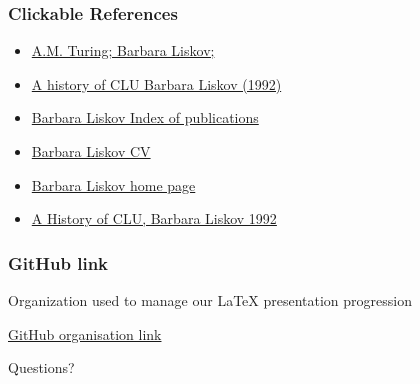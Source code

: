 \documentclass{beamer}
\begin{document}


\begin{frame}
\frametitle{Clickable References}
\begin{itemize}
\item \href{https://amturing.acm.org/award_winners/liskov_1108679.cfm}{ A.M. Turing; Barbara Liskov;} 

\item \href {https://dl.acm.org/doi/abs/10.1145/155360.155367}{A history of CLU Barbara Liskov (1992)}

\item \href{https://dblp.uni-trier.de/pid/l/BarbaraLiskov.html}{Barbara Liskov Index of publications}

\item \href{http://www.pmg.csail.mit.edu/~liskov/newcv-09.pdf}{Barbara Liskov CV}

\item \href{http://www.pmg.csail.mit.edu/~liskov/}{Barbara Liskov home page}

\item \href{https://citeseerx.ist.psu.edu/viewdoc/download?doi=10.1.1.46.9499&rep=rep1&type=pdf}{A History of CLU, Barbara Liskov 1992}
\end{itemize}
\end{frame}


\begin{frame}
\frametitle{GitHub link}

Organization used to manage our LaTeX presentation progression

\vspace{5mm}


\href{https://github.com/Research-Methods-Presentation}{GitHub organisation link} 

\end{frame}


\begin{frame}
\Huge{\centerline{Questions?}}
\end{frame}

\end{document}

